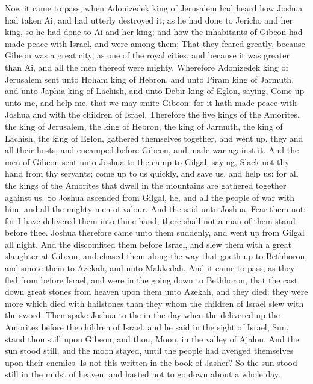 \begin{biblechapter} %
 Now it came to pass, when Adonizedek king of Jerusalem had heard how Joshua had taken Ai, and had utterly destroyed it; as he had done to Jericho and her king, so he had done to Ai and her king; and how the inhabitants of Gibeon had made peace with Israel, and were among them;
\verse That they feared greatly, because Gibeon was a great city, as one of the royal cities, and because it was greater than Ai, and all the men thereof were mighty.
\verse Wherefore Adonizedek king of Jerusalem sent unto Hoham king of Hebron, and unto Piram king of Jarmuth, and unto Japhia king of Lachish, and unto Debir king of Eglon, saying,
\verse Come up unto me, and help me, that we may smite Gibeon: for it hath made peace with Joshua and with the children of Israel.
\verse Therefore the five kings of the Amorites, the king of Jerusalem, the king of Hebron, the king of Jarmuth, the king of Lachish, the king of Eglon, gathered themselves together, and went up, they and all their hosts, and encamped before Gibeon, and made war against it.
\verse And the men of Gibeon sent unto Joshua to the camp to Gilgal, saying, Slack not thy hand from thy servants; come up to us quickly, and save us, and help us: for all the kings of the Amorites that dwell in the mountains are gathered together against us.
\verse So Joshua ascended from Gilgal, he, and all the people of war with him, and all the mighty men of valour.
\verse And the \LORD said unto Joshua, Fear them not: for I have delivered them into thine hand; there shall not a man of them stand before thee.
\verse Joshua therefore came unto them suddenly, and went up from Gilgal all night.
\verse And the \LORD discomfited them before Israel, and slew them with a great slaughter at Gibeon, and chased them along the way that goeth up to Bethhoron, and smote them to Azekah, and unto Makkedah.
\verse And it came to pass, as they fled from before Israel, and were in the going down to Bethhoron, that the \LORD cast down great stones from heaven upon them unto Azekah, and they died: they were more which died with hailstones than they whom the children of Israel slew with the sword.
\verse Then spake Joshua to the \LORD in the day when the \LORD delivered up the Amorites before the children of Israel, and he said in the sight of Israel, Sun, stand thou still upon Gibeon; and thou, Moon, in the valley of Ajalon.
\verse And the sun stood still, and the moon stayed, until the people had avenged themselves upon their enemies. Is not this written in the book of Jasher? So the sun stood still in the midst of heaven, and hasted not to go down about a whole day.

\end{biblechapter}
